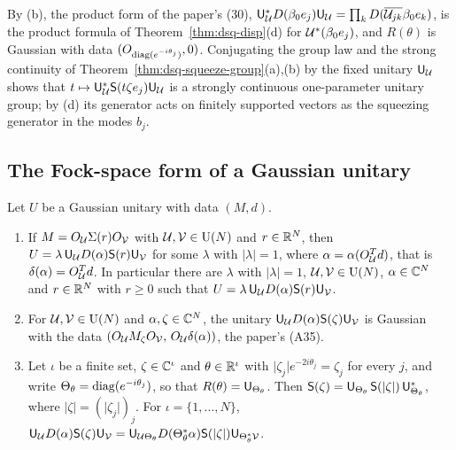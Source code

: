 \begin{veteenv}
By (b), the product form of the paper's (30), $\mathsf U_\mathcal U^*D(\beta_0e_j)\mathsf U_\mathcal U=\prod_kD(\overline{\mathcal U_{jk}}\beta_0e_k)$, is the product formula of
Theorem~\ref{thm:dsq-disp}(d) for $\mathcal U^*(\beta_0e_j)$, and $R(\theta)$ is Gaussian with data $(O_{\operatorname{diag}(e^{-i\theta_j})},0)$. Conjugating
the group law and the strong continuity of Theorem~\ref{thm:dsq-squeeze-group}(a),(b) by the fixed unitary $\mathsf U_\mathcal U$ shows that
$t\mapsto\mathsf U_\mathcal U^*\mathsf S(t\zeta e_j)\mathsf U_\mathcal U$ is a strongly continuous one-parameter unitary group; by (d) its generator acts on finitely
supported vectors as the squeezing generator in the modes $b_j$.

\subsection{The Fock-space form of a Gaussian unitary}\label{sec:gu-prop5}

\begin{theorem}\label{thm:gu-prop5}
Let $U$ be a Gaussian unitary with data $(M,d)$.
\begin{enumerate}
\item[(a)] If $M=O_\mathcal U\Sigma(r)O_\mathcal V$ with $\mathcal U,\mathcal V\in\mathrm{U}(N)$ and $r\in\mathbb R^N$, then $U=\lambda\,\mathsf U_\mathcal U D(\alpha)\mathsf S(r)\mathsf U_\mathcal V$ for some
$\lambda$ with $\lvert\lambda\rvert=1$, where $\alpha=\alpha(O_\mathcal U^Td)$, that is $\delta(\alpha)=O_\mathcal U^Td$. In particular there are $\lambda$ with
$\lvert\lambda\rvert=1$, $\mathcal U,\mathcal V\in\mathrm{U}(N)$, $\alpha\in\mathbb C^N$ and $r\in\mathbb R^N$ with $r\ge0$ such that $U=\lambda\,\mathsf U_\mathcal U D(\alpha)\mathsf S(r)\mathsf U_\mathcal V$.
\item[(b)] For $\mathcal U,\mathcal V\in\mathrm{U}(N)$ and $\alpha,\zeta\in\mathbb C^N$, the unitary $\mathsf U_\mathcal U D(\alpha)\mathsf S(\zeta)\mathsf U_\mathcal V$ is Gaussian with the
data $(O_\mathcal U M_\zeta O_\mathcal V,\,O_\mathcal U\delta(\alpha))$, the paper's (A35).
\item[(c)] Let $\iota$ be a finite set, $\zeta\in\mathbb C^\iota$ and $\theta\in\mathbb R^\iota$ with $\lvert\zeta_j\rvert e^{-2i\theta_j}=\zeta_j$ for
every $j$, and write $\Theta_\theta=\operatorname{diag}(e^{-i\theta_j})$, so that $R(\theta)=\mathsf U_{\Theta_\theta}$. Then $\mathsf S(\zeta)=\mathsf U_{\Theta_\theta}\,\mathsf S(\lvert\zeta\rvert)\,
\mathsf U_{\Theta_\theta}^*$, where $\lvert\zeta\rvert=(\lvert\zeta_j\rvert)_j$. For $\iota=\{1,\ldots,N\}$,
$\mathsf U_\mathcal U D(\alpha)\mathsf S(\zeta)\mathsf U_\mathcal V=\mathsf U_{\mathcal U\Theta_\theta}D(\Theta_\theta^*\alpha)\mathsf S(\lvert\zeta\rvert)\mathsf U_{\Theta_\theta^*\mathcal V}$.
\end{enumerate}
\end{theorem}


\end{veteenv}

